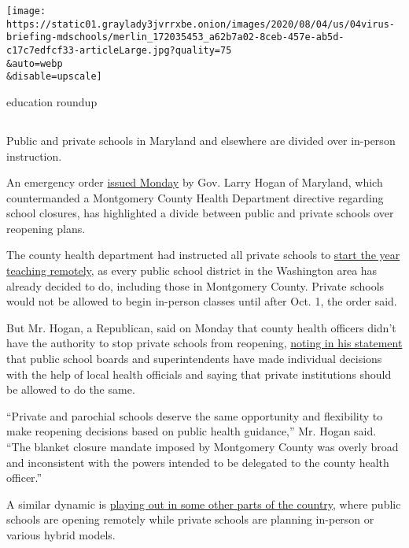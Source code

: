 \texttt{[image: https://static01.graylady3jvrrxbe.onion/images/2020/08/04/us/04virus-briefing-mdschools/merlin\_172035453\_a62b7a02-8ceb-457e-ab5d-c17c7edfcf33-articleLarge.jpg?quality=75\\\&auto=webp\\\&disable=upscale]}

education roundup

\subsection{}

Public and private schools in Maryland and elsewhere are divided over
in-person instruction.

An emergency order
\href{https://twitter.com/GovLarryHogan/status/1290330304830246912}{issued
Monday} by Gov. Larry Hogan of Maryland, which countermanded a
Montgomery County Health Department directive regarding school closures,
has highlighted a divide between public and private schools over
reopening plans.

The county health department had instructed all private schools to
\href{https://www.montgomerycountymd.gov/OPI/Resources/Files/pdf/2020/NonPublicSchools_07-31-20.pdf}{start
the year teaching remotely}, as every public school district in the
Washington area has already decided to do, including those in Montgomery
County. Private schools would not be allowed to begin in-person classes
until after Oct. 1, the order said.

But Mr. Hogan, a Republican, said on Monday that county health officers
didn't have the authority to stop private schools from reopening,
\href{https://twitter.com/GovLarryHogan/status/1290330304830246912/photo/1}{noting
in his statement} that public school boards and superintendents have
made individual decisions with the help of local health officials and
saying that private institutions should be allowed to do the same.

``Private and parochial schools deserve the same opportunity and
flexibility to make reopening decisions based on public health
guidance,'' Mr. Hogan said. ``The blanket closure mandate imposed by
Montgomery County was overly broad and inconsistent with the powers
intended to be delegated to the county health officer.''

A similar dynamic is
\href{https://www.nytimes3xbfgragh.onion/2020/07/16/upshot/coronavirus-school-reopening-private-public-gap.html}{playing
out in some other parts of the country}, where public schools are
opening remotely while private schools are planning in-person or various
hybrid models.

